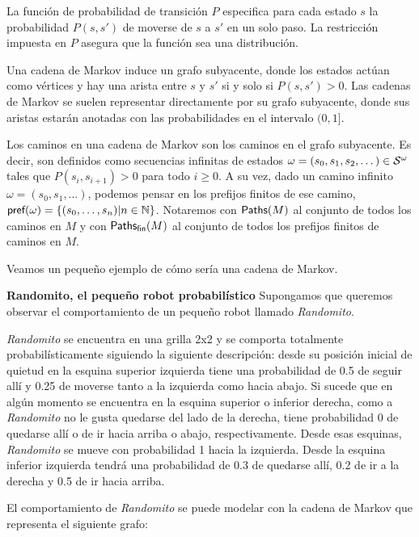 La función de probabilidad de transición $P$ especifica para cada estado $s$ la
probabilidad $P(s, s')$ de moverse de $s$ a $s'$ en un solo paso. La
restricción impuesta en $P$ asegura que la función sea una distribución.

Una cadena de Markov induce un grafo subyacente, donde los estados actúan como
vértices y hay una arista entre $s$ y $s'$ si y solo si $P(s, s') > 0$. Las
cadenas de Markov se suelen representar directamente por su grafo subyacente,
donde sus aristas estarán anotadas con las probabilidades en el intervalo $(0,
	1]$.

Los caminos en una cadena de Markov son los caminos en el grafo subyacente. Es
decir, son definidos como secuencias infinitas de estados $\omega = (s_0, s_1,
	s_2, \dots) \in \mathcal{S}^\omega$ tales que $P(s_i, s_{i+1}) > 0 $ para todo $i \geq
	0$. A su vez, dado un camino infinito $\omega = (s_0, s_1, \dots)$, podemos
pensar en los prefijos finitos de ese camino, $\textsf{pref}(\omega) = \{(s_0,
	\dots, s_n) | n \in \mathbb{N}\}$. Notaremos con $\textsf{Paths}(M)$ al conjunto de
todos los caminos en $M$ y con $\textsf{Paths}_\textsf{fin}(M)$ al conjunto de todos los prefijos
finitos de caminos en $M$.

Veamos un pequeño ejemplo de cómo sería una cadena de Markov.

\textbf{Randomito, el pequeño robot probabilístico}
Supongamos que queremos observar el comportamiento de un pequeño robot llamado \textit{Randomito}.

\textit{Randomito} se encuentra en una grilla 2x2 y se comporta totalmente probabilísticamente siguiendo la siguiente descripción: desde su posición inicial de quietud en la esquina superior izquierda tiene una probabilidad de 0.5 de seguir allí y 0.25 de moverse tanto a la izquierda como hacia abajo. Si sucede que en algún momento se encuentra en la esquina superior o inferior derecha, como a \emph{Randomito} no le gusta quedarse del lado de la derecha, tiene probabilidad 0 de quedarse allí o de ir hacia arriba o abajo, respectivamente. Desde esas esquinas, \emph{Randomito} se mueve con probabilidad 1 hacia la izquierda. Desde la esquina inferior izquierda tendrá una probabilidad de 0.3 de quedarse allí, 0.2 de ir a la derecha y 0.5 de ir hacia arriba.

El comportamiento de \emph{Randomito} se puede modelar con la cadena de Markov
que representa el siguiente grafo:

